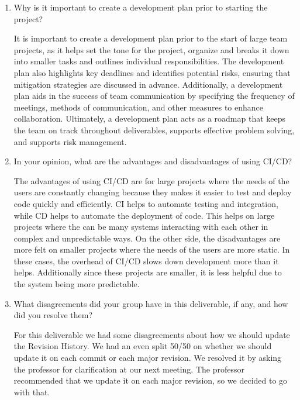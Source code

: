 \documentclass{article}
\begin{document}
\begin{enumerate}
    \item Why is it important to create a development plan prior to starting the
    project?

    It is important to create a development plan prior to the start of large team projects, as it helps set the tone for the project, organize and breaks it down into smaller tasks and outlines individual responsibilities. 
    The development plan also highlights key deadlines and identifies potential risks, ensuring that mitigation strategies are discussed in advance.
    Additionally, a development plan aids in the success of team communication by specifying the frequency of meetings, methods of communication, and other measures to enhance collaboration.
    Ultimately, a development plan acts as a roadmap that keeps the team on track throughout deliverables, supports effective problem solving, and supports risk management.

    \item In your opinion, what are the advantages and disadvantages of using
    CI/CD?

    The advantages of using CI/CD are for large projects where the needs of the users are constantly changing because they makes it easier to test and deploy code quickly and efficiently.
    CI helps to automate testing and integration, while CD helps to automate the deployment of code.
    This helps on large projects where the can be many systems interacting with each other in complex and unpredictable ways.
    On the other side, the disadvantages are more felt on smaller projects where the needs of the users are more static.
    In these cases, the overhead of CI/CD slows down development more than it helps.
    Additionally since these projects are smaller, it is less helpful due to the system being more predictable.


    \item What disagreements did your group have in this deliverable, if any,
    and how did you resolve them?

    For this deliverable we had some disagreements about how we should update the Revision History.
    We had an even split 50/50 on whether we should update it on each commit or each major revision.
    We resolved it by asking the professor for clarification at our next meeting.
    The professor recommended that we update it on each major revision, so we decided to go with that.

    
\end{enumerate}
\end{document}
